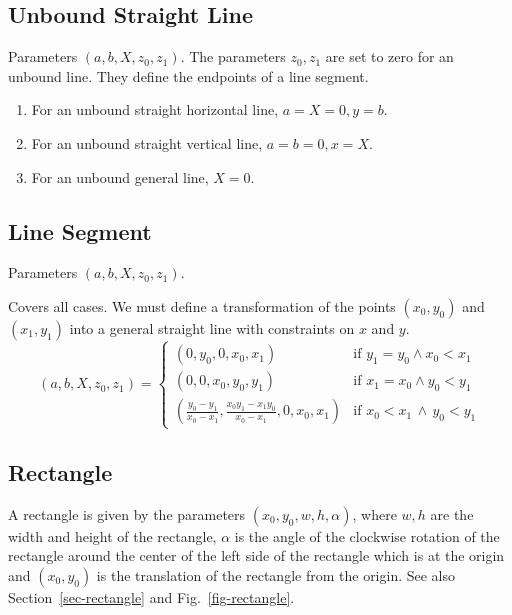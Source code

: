 \documentclass[11pt]{article}
\newcommand{\figref}[1]{Fig.~\eqref{#1}}
\begin{document}
\subsection{Unbound Straight Line}
\label{sec-representation-line}

Parameters $(a, b, X, z_0, z_1)$.
The parameters $z_0, z_1$ are set to zero for an unbound line. They define
the endpoints of a line segment.

\begin{enumerate}
    \item For an unbound straight horizontal line, $a=X=0, y=b$.
    \item For an unbound straight vertical line, $a=b=0, x=X$.
    \item For an unbound general line, $X=0$.
\end{enumerate}

\subsection{Line Segment}
\label{sec-representation-line-segment}

Parameters $(a, b, X, z_0, z_1)$.

Covers all cases. We must define a transformation of the points $(x_0, y_0)$
and $(x_1, y_1)$  into a general straight line with constraints on $x$ and $y$.
\begin{equation}
    (a, b, X, z_0, z_1) =
    \begin{cases}
        (0, y_0, 0, x_0, x_1)  &
        \text{if $y_1 = y_0\land x_0 < x_1$}\\
        (0, 0, x_0, y_0, y_1) &
        \text{if $x_1 = x_0\land  y_0 < y_1 $}\\
        \left(\frac{y_0 - y_1}{x_0-x_1},
            \frac{x_0 y_1 - x_1 y_0}{x_0 - x_1}, 0, x_0, x_1\right) &
            \text{if $x_0< x_1\,\land\,y_0< y_1$}
    \end{cases}
\end{equation}

\subsection{Rectangle}

A rectangle is given by the parameters $(x_0, y_0, w, h, \alpha)$, where $w, 
h$ are the width and height of the rectangle, $\alpha$ is the angle 
of the clockwise rotation of the rectangle around the center of the left side
of the rectangle which is at the origin and $(x_0, y_0)$ is the translation 
of the rectangle from the origin.
See also Section~\ref{sec-rectangle} and \figref{fig-rectangle}.
\end{document}
